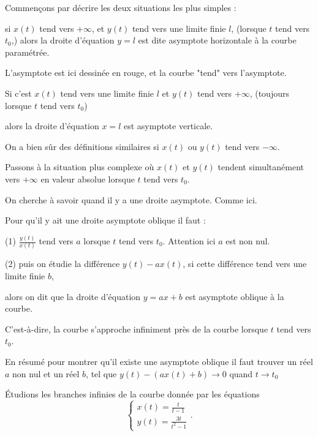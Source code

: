 \change
Commençons par décrire les deux situations les plus simples :

si  $x(t)$ tend vers 
$+ \infty$, et $y(t)$ tend vers une limite finie $l$, (lorsque  $t$ tend vers $t_0$,)
alors la droite d'équation $y=l$ est dite asymptote horizontale à 
la courbe paramétrée.

\change
L'asymptote est ici dessinée en rouge, et la courbe "tend" vers l'asymptote.

\change
Si c'est $x(t)$ tend vers une limite finie $l$ et $y(t)$ tend vers $+\infty$,   
(toujours lorsque  $t$ tend vers $t_0$) 

alors la droite d'équation $x=l$ est 
asymptote verticale.

\change

On a bien sûr des définitions similaires si $x(t)$ ou $y(t)$ 
tend vers $-\infty$.


\diapo

Passons à la situation plus complexe où  $x(t)$ et $y(t)$ 
tendent simultanément vers $+\infty$ en valeur absolue 
lorsque $t$ tend vers $t_0$. 

\change
On cherche à savoir quand il y a une droite asymptote.
Comme ici.

\change
Pour qu'il y ait une droite asymptote oblique il faut :

(1) $\frac{y(t)}{x(t)}$ tend vers $a$ lorsque  $t$ tend vers $t_0$.
Attention ici $a$ est non nul.

\change
(2) puis on étudie la différence $y(t)-ax(t)$, si cette différence
tend vers une limite finie $b$,

alors on dit que la droite d'équation $y=ax+b$ est asymptote oblique 
à la courbe. 

C'est-à-dire, la courbe s'approche infiniment près de la courbe 
lorsque $t$ tend vers $t_0$.

\change

En résumé pour montrer qu'il existe une asymptote oblique il faut trouver
un réel $a$ non nul et un réel $b$, tel que 
$y(t)-(ax(t)+b) \to 0$ quand $t \to t_0$




\diapo

\'Etudions les branches infinies de la courbe donnée par les équations
$$\left\{\begin{array}{l} x(t) = \frac{t}{t-1} \\ y(t) = \frac{3t}{t^2-1} \end{array}\right..$$

